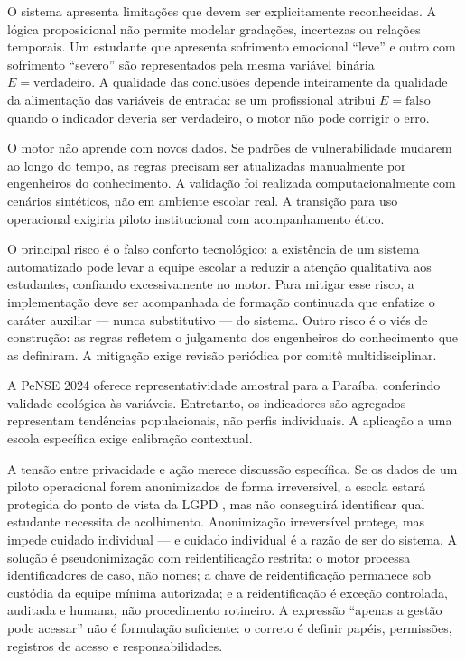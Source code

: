 \documentclass[
    12pt,
    openright,
    oneside,
    a4paper,
    english,
    brazil
]{abntex2}
\begin{document}
O sistema apresenta limita\c{c}\~oes que devem ser explicitamente reconhecidas. A l\'ogica proposicional n\~ao permite modelar grada\c{c}\~oes, incertezas ou rela\c{c}\~oes temporais. Um estudante que apresenta sofrimento emocional ``leve'' e outro com sofrimento ``severo'' s\~ao representados pela mesma vari\'avel bin\'aria $E = \text{verdadeiro}$. A qualidade das conclus\~oes depende inteiramente da qualidade da alimenta\c{c}\~ao das vari\'aveis de entrada: se um profissional atribui $E = \text{falso}$ quando o indicador deveria ser verdadeiro, o motor n\~ao pode corrigir o erro.

O motor n\~ao aprende com novos dados. Se padr\~oes de vulnerabilidade mudarem ao longo do tempo, as regras precisam ser atualizadas manualmente por engenheiros do conhecimento. A valida\c{c}\~ao foi realizada computacionalmente com cen\'arios sint\'eticos, n\~ao em ambiente escolar real. A transi\c{c}\~ao para uso operacional exigiria piloto institucional com acompanhamento \'etico.

O principal risco \'e o falso conforto tecnol\'ogico: a exist\^encia de um sistema automatizado pode levar a equipe escolar a reduzir a aten\c{c}\~ao qualitativa aos estudantes, confiando excessivamente no motor. Para mitigar esse risco, a implementa\c{c}\~ao deve ser acompanhada de forma\c{c}\~ao continuada que enfatize o car\'ater auxiliar --- nunca substitutivo --- do sistema. Outro risco \'e o vi\'es de constru\c{c}\~ao: as regras refletem o julgamento dos engenheiros do conhecimento que as definiram. A mitiga\c{c}\~ao exige revis\~ao peri\'odica por comit\^e multidisciplinar.

A PeNSE 2024 oferece representatividade amostral para a Para\'iba, conferindo validade ecol\'ogica \`as vari\'aveis. Entretanto, os indicadores s\~ao agregados --- representam tend\^encias populacionais, n\~ao perfis individuais. A aplica\c{c}\~ao a uma escola espec\'ifica exige calibra\c{c}\~ao contextual.

A tens\~ao entre privacidade e a\c{c}\~ao merece discuss\~ao espec\'ifica. Se os dados de um piloto operacional forem anonimizados de forma irrevers\'ivel, a escola estar\'a protegida do ponto de vista da LGPD \cite{brasil_lgpd_2018}, mas n\~ao conseguir\'a identificar qual estudante necessita de acolhimento. Anonimiza\c{c}\~ao irrevers\'ivel protege, mas impede cuidado individual --- e cuidado individual \'e a raz\~ao de ser do sistema. A solu\c{c}\~ao \'e pseudonimiza\c{c}\~ao com reidentifica\c{c}\~ao restrita: o motor processa identificadores de caso, n\~ao nomes; a chave de reidentifica\c{c}\~ao permanece sob cust\'odia da equipe m\'inima autorizada; e a reidentifica\c{c}\~ao \'e exce\c{c}\~ao controlada, auditada e humana, n\~ao procedimento rotineiro. A express\~ao ``apenas a gest\~ao pode acessar'' n\~ao \'e formula\c{c}\~ao suficiente: o correto \'e definir pap\'eis, permiss\~oes, registros de acesso e responsabilidades.
\end{document}
